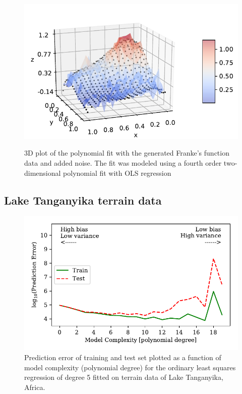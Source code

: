\documentclass[a4paper, 10pt]{article}
\begin{document}
\begin{figure}[H]
	\includegraphics[scale=1]{figs/3dmodel_OLS_Franke.pdf}
	\label{fig:3d_OLS_Franke}
	\caption{3D plot of the polynomial fit with the generated Franke's function data and added noise. The fit was modeled using a fourth order two-dimensional polynomial fit with OLS regression }
\end{figure}




\subsection{Lake Tanganyika terrain data}


\begin{figure}[H]
    \includegraphics[scale=1]{figs/biasvariancetradeoff_ols_terrain.pdf}
    \caption{Prediction error of training and test set plotted as a function of model complexity (polynomial degree) for the ordinary least squares regression of degree 5 fitted on terrain data of Lake Tanganyika, Africa.}
    \label{fig:bias_ols_terrain}
\end{figure}
\end{document}
